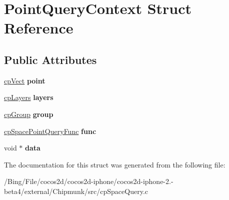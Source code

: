 \hypertarget{struct_point_query_context}{\section{Point\-Query\-Context Struct Reference}
\label{struct_point_query_context}
}
\subsection*{Public Attributes}
\begin{DoxyCompactItemize}
\item 
\hypertarget{struct_point_query_context_a3a29caab289455cc548305d1d4e377f2}{\hyperlink{structcp_vect}{cp\-Vect} {\bfseries point}}\label{struct_point_query_context_a3a29caab289455cc548305d1d4e377f2}

\item 
\hypertarget{struct_point_query_context_af27812dbf44ece4e9b0b99abe9f08c37}{\hyperlink{group__basic_types_ga5ec31e87ed3973cab80f9bfbbbcb43bb}{cp\-Layers} {\bfseries layers}}\label{struct_point_query_context_af27812dbf44ece4e9b0b99abe9f08c37}

\item 
\hypertarget{struct_point_query_context_a41e19165a4e7a638ebd6799bd13fb94d}{\hyperlink{group__basic_types_gacd811b1135a8f4a3e5cc019552b18b1a}{cp\-Group} {\bfseries group}}\label{struct_point_query_context_a41e19165a4e7a638ebd6799bd13fb94d}

\item 
\hypertarget{struct_point_query_context_a135bc5f7de7c04dd9304009e0d1b8aa3}{\hyperlink{group__cp_space_ga6baa5a302b275b18516294fc3106ca58}{cp\-Space\-Point\-Query\-Func} {\bfseries func}}\label{struct_point_query_context_a135bc5f7de7c04dd9304009e0d1b8aa3}

\item 
\hypertarget{struct_point_query_context_a20943bc66fa0df9cd7a115ecbab648ce}{void $\ast$ {\bfseries data}}\label{struct_point_query_context_a20943bc66fa0df9cd7a115ecbab648ce}

\end{DoxyCompactItemize}


The documentation for this struct was generated from the following file\-:\begin{DoxyCompactItemize}
\item 
/\-Bing/\-File/cocos2d/cocos2d-\/iphone/cocos2d-\/iphone-\/2.-\/beta4/external/\-Chipmunk/src/cp\-Space\-Query.\-c\end{DoxyCompactItemize}
